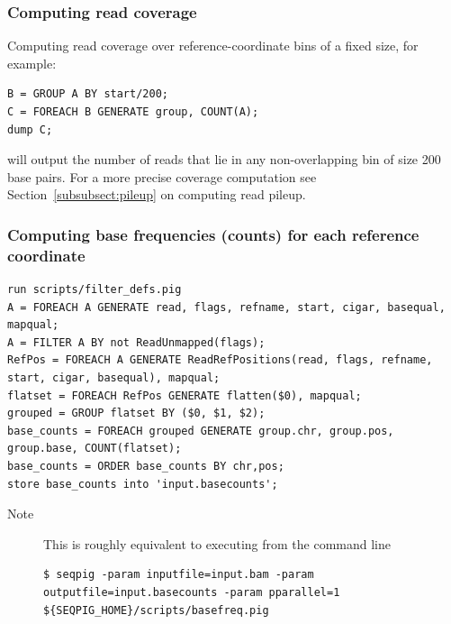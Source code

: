  \subsubsection{Computing read coverage}
Computing read coverage over reference-coordinate bins of a fixed size,
for example:
\begin{lstlisting}
B = GROUP A BY start/200;
C = FOREACH B GENERATE group, COUNT(A);
dump C; 
\end{lstlisting}
will output the number of reads that lie in any non-overlapping bin of size 200 base pairs.
For a more precise coverage computation see Section~\ref{subsubsect:pileup} on computing
read pileup.

 \subsubsection{Computing base frequencies (counts) for each reference coordinate}

\begin{lstlisting}
run scripts/filter_defs.pig
A = FOREACH A GENERATE read, flags, refname, start, cigar, basequal, mapqual;
A = FILTER A BY not ReadUnmapped(flags);
RefPos = FOREACH A GENERATE ReadRefPositions(read, flags, refname, start, cigar, basequal), mapqual;
flatset = FOREACH RefPos GENERATE flatten($0), mapqual;
grouped = GROUP flatset BY ($0, $1, $2);
base_counts = FOREACH grouped GENERATE group.chr, group.pos, group.base, COUNT(flatset);
base_counts = ORDER base_counts BY chr,pos;
store base_counts into 'input.basecounts';
\end{lstlisting}
\begin{description}
	\item[Note] This is roughly equivalent to executing from the command line
\begin{lstlisting}
$ seqpig -param inputfile=input.bam -param outputfile=input.basecounts -param pparallel=1 ${SEQPIG_HOME}/scripts/basefreq.pig 
\end{lstlisting}
\end{description}

